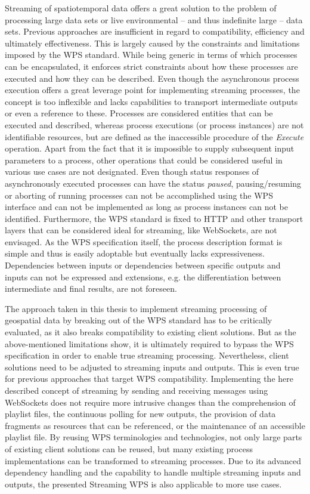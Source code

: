 Streaming of spatiotemporal data offers a great solution to the problem of processing large data sets or live environmental -- and thus indefinite large -- data sets. Previous approaches are insufficient in regard to compatibility, efficiency and ultimately effectiveness. This is largely caused by the constraints and limitations imposed by the WPS standard. While being generic in terms of which processes can be encapsulated, it enforces strict constraints about how these processes are executed and how they can be described. Even though the asynchronous process execution offers a great leverage point for implementing streaming processes, the concept is too inflexible and lacks capabilities to transport intermediate outputs or even a reference to these. Processes are considered entities that can be executed and described, whereas process executions (or process instances) are not identifiable resources, but are defined as the inaccessible procedure of the \emph{Execute} operation. Apart from the fact that it is impossible to supply subsequent input parameters to a process, other operations that could be considered useful in various use cases are not designated. Even though status responses of asynchronously executed processes can have the status \emph{paused}, pausing/resuming or aborting of running processes can not be accomplished using the WPS interface and can not be implemented as long as process instances can not be identified. Furthermore, the WPS standard is fixed to HTTP and other transport layers that can be considered ideal for streaming, like WebSockets, are not envisaged.
As the WPS specification itself, the process description format is simple and thus is easily adoptable but eventually lacks expressiveness. Dependencies between inputs or dependencies between specific outputs and inputs can not be expressed and extensions, e.g. the differentiation between intermediate and final results, are not foreseen.

The approach taken in this thesis to implement streaming processing of geospatial data by breaking out of the WPS standard has to be critically evaluated, as it also breaks compatibility to existing client solutions. But as the above-mentioned limitations show, it is ultimately required to bypass the WPS specification in order to enable true streaming processing. Nevertheless, client solutions need to be adjusted to streaming inputs and outputs. This is even true for previous approaches that target WPS compatibility. Implementing the here described concept of streaming by sending and receiving messages using WebSockets does not require more intrusive changes than the comprehension of playlist files, the continuous polling for new outputs, the provision of data fragments as resources that can be referenced, or the maintenance of an accessible playlist file. By reusing WPS terminologies and technologies, not only large parts of existing client solutions can be reused, but many existing process implementations can be transformed to streaming processes. Due to its advanced dependency handling and the capability to handle multiple streaming inputs and outputs, the presented Streaming WPS is also applicable to more use cases.

